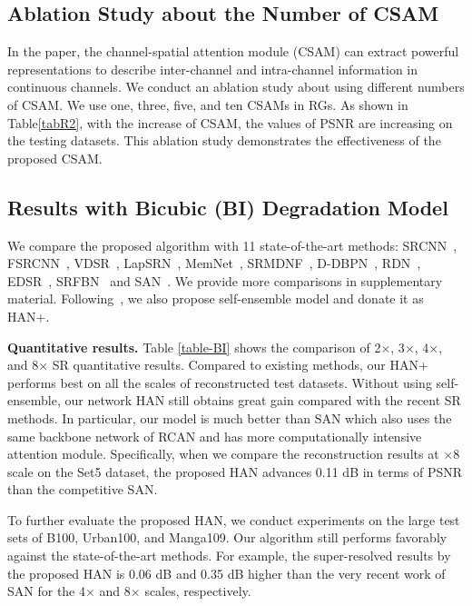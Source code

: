 \documentclass[runningheads]{llncs}
\begin{document}
\subsection{Ablation Study about the Number of CSAM}
In the paper, the channel-spatial attention module (CSAM) can extract powerful representations to describe inter-channel and intra-channel information in continuous channels. We conduct an ablation study about using different numbers of CSAM. We use one, three, five, and ten CSAMs in RGs. As shown in Table\ref{tabR2}, with the increase of CSAM, the values of PSNR are increasing on the testing datasets. 
This ablation study demonstrates the effectiveness of the proposed CSAM.




\subsection{Results with Bicubic (BI) Degradation Model}
We compare the proposed algorithm with 11 state-of-the-art methods: SRCNN~\cite{dong2014learning}, FSRCNN~\cite{dong2016accelerating}, VDSR~\cite{kim2016accurate}, LapSRN~\cite{lai2017deep}, MemNet~\cite{tai2017memnet}, SRMDNF~\cite{zhang2018learning}, D-DBPN~\cite{haris2018deep}, RDN~\cite{zhang2018residual}, EDSR~\cite{lim2017enhanced}, SRFBN~\cite{li2019feedback} and SAN~\cite{dai2019second}. We provide more comparisons in supplementary material.
Following~\cite{lim2017enhanced,dai2019second,zhang2018image},  we also propose self-ensemble model and donate it as HAN+.



\textbf{Quantitative results.} Table \ref{table-BI} shows the comparison of 2$\times$, 3$ \times$, 4$ \times $, and 8$ \times $ SR quantitative results. Compared to existing methods, our HAN+ performs best on all the scales of reconstructed test datasets. Without using self-ensemble, our network HAN still obtains great gain compared with the recent SR methods. 
In particular, our model is much better than SAN which also uses the same backbone network of RCAN and has more computationally intensive attention module.
Specifically, when we compare the reconstruction results at $ \times $8 scale on the Set5 dataset, the proposed HAN advances 0.11 dB in terms of PSNR than the competitive SAN.





To further evaluate the proposed HAN, we conduct experiments on the large test sets of B100, Urban100, and Manga109. Our algorithm still performs favorably against the state-of-the-art methods. For example, the super-resolved results by the proposed HAN is 0.06 dB and 0.35 dB higher than the very recent work of SAN for the 4$ \times $ and 8$ \times $ scales, respectively.
\end{document}
